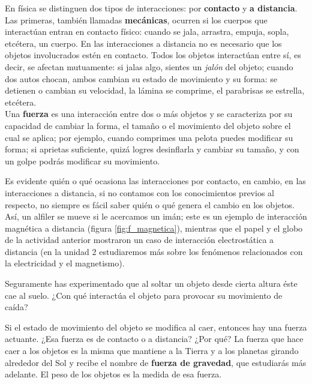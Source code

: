 \documentclass[11pt]{book}
\begin{document}
\begin{minipage}[t]{0.55\textwidth}

  En física se distinguen dos tipos de interacciones: por \textbf{contacto} y \textbf{a distancia}.
  Las primeras, también llamadas \textbf{mecánicas}, ocurren si los cuerpos que interactúan entran
  en contacto físico: cuando se jala, arrastra, empuja, sopla, etcétera, un cuerpo.
  En las interacciones a distancia no es necesario que los objetos involucrados estén en contacto.
  Todos los objetos interactúan entre sí, es decir, se afectan mutuamente: si jalas algo,
  sientes un \emph{jalón} del objeto; cuando dos autos chocan, ambos cambian su estado de movimiento
  y su forma: se detienen o cambian su velocidad, la lámina se comprime, el parabrisas se estrella,
  etcétera.\\

  Una \textbf{fuerza} es una interacción entre dos o más objetos y se caracteriza por su capacidad de
  cambiar la forma, el tamaño o el movimiento del objeto sobre el cual se aplica; por ejemplo,
  cuando comprimes una pelota puedes modificar su forma; si aprietas suficiente, quizá logres
  desinflarla y cambiar su tamaño, y con un golpe podrás modificar su movimiento.

  Es evidente quién o qué ocasiona las interacciones por contacto, en cambio, en las interacciones
  a distancia, si no contamos con los conocimientos previos al respecto, no siempre es fácil
  saber quién o qué genera el cambio en los objetos. Así, un alfiler se mueve si le acercamos
  un imán; este es un ejemplo de interacción magnética a distancia (figura \ref{fig:f_magnetica}),
  mientras que
  el papel y el globo de la actividad anterior mostraron un caso de interacción electrostática
  a distancia (en la unidad 2 estudiaremos más sobre los fenómenos relacionados con la electricidad
  y el magnetismo).

  Seguramente has experimentado que al soltar un objeto desde cierta altura éste cae al suelo.
  ¿Con qué interactúa el objeto para provocar su movimiento de caída?
\end{minipage}

Si el estado de movimiento
del objeto se modifica al caer, entonces hay una fuerza actuante. ¿Esa fuerza es de contacto o
a distancia? ¿Por qué?
La fuerza que hace caer a los objetos es la misma que mantiene a la Tierra y a los planetas
girando alrededor del Sol y recibe el nombre de \textbf{fuerza de gravedad}, que estudiarás más
adelante.
El peso de los objetos es la medida de esa fuerza.
\end{document}

